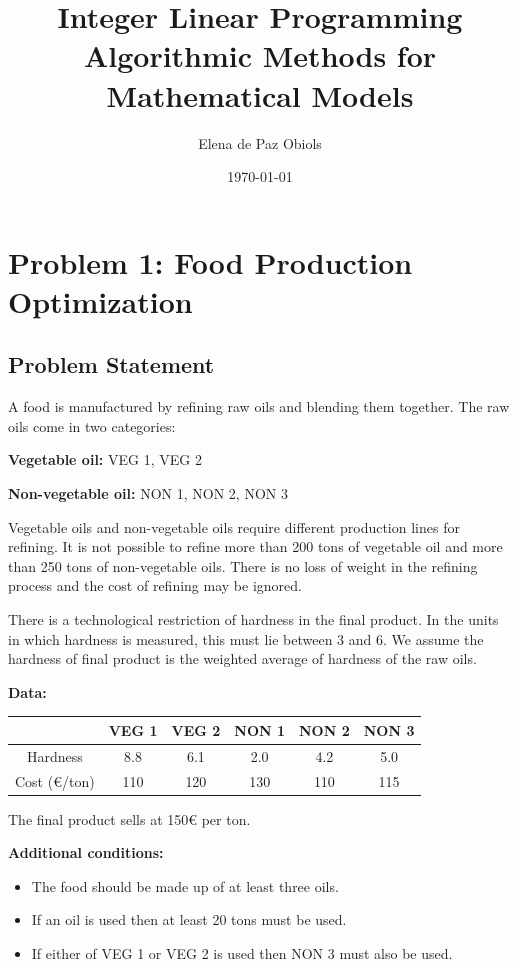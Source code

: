 \documentclass[a4paper,10pt]{article}
\title{Integer Linear Programming\\Algorithmic Methods for Mathematical Models}
\author{Elena de Paz Obiols}
\date{\today}
\begin{document}
\maketitle

\section*{Problem 1: Food Production Optimization}

\subsection*{Problem Statement}

A food is manufactured by refining raw oils and blending them together. The raw oils come in two categories:

\textbf{Vegetable oil:} VEG 1, VEG 2

\textbf{Non-vegetable oil:} NON 1, NON 2, NON 3

Vegetable oils and non-vegetable oils require different production lines for refining. It is not possible to refine more than 200 tons of vegetable oil and more than 250 tons of non-vegetable oils. There is no loss of weight in the refining process and the cost of refining may be ignored.

There is a technological restriction of hardness in the final product. In the units in which hardness is measured, this must lie between 3 and 6. We assume the hardness of final product is the weighted average of hardness of the raw oils.

\textbf{Data:}
\begin{center}
\begin{tabular}{|c|c|c|c|c|c|}
\hline
& VEG 1 & VEG 2 & NON 1 & NON 2 & NON 3 \\
\hline
Hardness & 8.8 & 6.1 & 2.0 & 4.2 & 5.0 \\
\hline
Cost (\euro/ton) & 110 & 120 & 130 & 110 & 115 \\
\hline
\end{tabular}
\end{center}

The final product sells at 150{\euro} per ton.

\textbf{Additional conditions:}
\begin{itemize}
    \item The food should be made up of at least three oils.
    \item If an oil is used then at least 20 tons must be used.
    \item If either of VEG 1 or VEG 2 is used then NON 3 must also be used.
\end{itemize}
\end{document}
